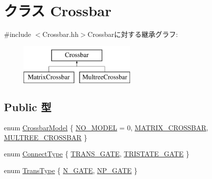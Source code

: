 \hypertarget{classCrossbar}{
\section{クラス Crossbar}
\label{classCrossbar}
}


{\ttfamily \#include $<$Crossbar.hh$>$}Crossbarに対する継承グラフ:\begin{figure}[H]
\begin{center}
\leavevmode
\includegraphics[height=2cm]{classCrossbar}
\end{center}
\end{figure}
\subsection*{Public 型}
\begin{DoxyCompactItemize}
\item 
enum \hyperlink{classCrossbar_aa40a1579cdca31019cb80ae5fd05b613}{CrossbarModel} \{ \hyperlink{classCrossbar_aa40a1579cdca31019cb80ae5fd05b613abab57b6e2c553e4d983f415a1f4ea75b}{NO\_\-MODEL} =  0, 
\hyperlink{classCrossbar_aa40a1579cdca31019cb80ae5fd05b613a1bf7220218f4bbf45ff5231434afe8c8}{MATRIX\_\-CROSSBAR}, 
\hyperlink{classCrossbar_aa40a1579cdca31019cb80ae5fd05b613a0eb4d083eee114c10349b7b244344d18}{MULTREE\_\-CROSSBAR}
 \}
\item 
enum \hyperlink{classCrossbar_a66513072647c657801d01bec3737a050}{ConnectType} \{ \hyperlink{classCrossbar_a66513072647c657801d01bec3737a050a0cf3bc72a90ad0cd54a6ed97ac8c6c1b}{TRANS\_\-GATE}, 
\hyperlink{classCrossbar_a66513072647c657801d01bec3737a050ad86651e2f954a39e7b84960be966123e}{TRISTATE\_\-GATE}
 \}
\item 
enum \hyperlink{classCrossbar_acee593b112f4fc85f850631b9c6aaae9}{TransType} \{ \hyperlink{classCrossbar_acee593b112f4fc85f850631b9c6aaae9a1519be35cfe33e8259c08e59f87358b8}{N\_\-GATE}, 
\hyperlink{classCrossbar_acee593b112f4fc85f850631b9c6aaae9a90021e7e91707771d3c648f4b4c1a1ba}{NP\_\-GATE}
 \}
\end{DoxyCompactItemize}
